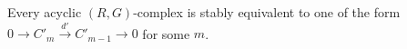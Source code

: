 Every acyclic $(R, G)$-complex is stably equivalent to one of the form $0 \to C'_m \xrightarrow{d'} C'_{m-1} \to 0$ for some $m$.
